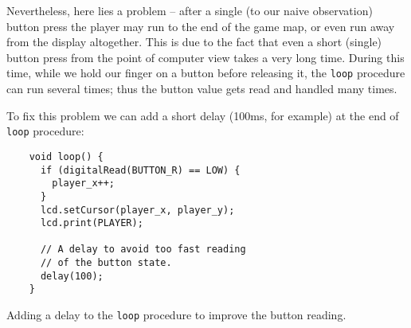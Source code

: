 \documentclass[../sparc.tex]{subfiles}
\begin{document}
Nevertheless, here lies a problem -- after a single (to our naive observation)
button press the player may run to the end of the game map, or even run away
from the display altogether.  This is due to the fact that even a short (single)
button press from the point of computer view takes a very long time.  During
this time, while we hold our finger on a button before releasing it, the
\texttt{loop} procedure can run several times; thus the button value
gets read and handled many times.

To fix this problem we can add a short delay (100ms, for example) at the end of
\texttt{loop} procedure:

\begin{listing}[H]
  \begin{verbatim}
    void loop() {
      if (digitalRead(BUTTON_R) == LOW) {
        player_x++;
      }
      lcd.setCursor(player_x, player_y);
      lcd.print(PLAYER);

      // A delay to avoid too fast reading
      // of the button state.
      delay(100);
    }
  \end{verbatim}
  \caption{Adding a delay to the \texttt{loop} procedure to improve the
    button reading.}
  \label{listing:game-dev-button-delay}
\end{listing}
\end{document}
